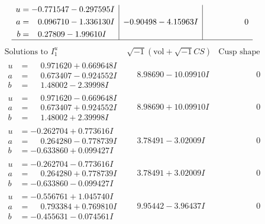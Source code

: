 \documentclass[1p]{elsarticle_modified}
\theoremstyle{definition}
\newcommand{\I}{\sqrt{-1}}
\begin{document}
$$\begin{array}{c|c|c}
\begin{aligned}
u &= -0.771547 - 0.297595 I \\
a &= \phantom{-}0.096710 - 1.336130 I \\
b &= \phantom{-}0.27809 - 1.99610 I\end{aligned}
 & -0.90498 - 4.15963 I & \phantom{-0.000000 } 0\\
 \hline 
 \end{array}$$\newpage$$\begin{array}{c|c|c}  
\text{Solutions to }I^u_{1}& \I (\text{vol} + \sqrt{-1}CS) & \text{Cusp shape}\\
 \hline 
\begin{aligned}
u &= \phantom{-}0.971620 + 0.669648 I \\
a &= \phantom{-}0.673407 - 0.924552 I \\
b &= \phantom{-}1.48002 - 2.39998 I\end{aligned}
 & \phantom{-}8.98690 - 10.09910 I & \phantom{-0.000000 } 0 \\ \hline\begin{aligned}
u &= \phantom{-}0.971620 - 0.669648 I \\
a &= \phantom{-}0.673407 + 0.924552 I \\
b &= \phantom{-}1.48002 + 2.39998 I\end{aligned}
 & \phantom{-}8.98690 + 10.09910 I & \phantom{-0.000000 } 0 \\ \hline\begin{aligned}
u &= -0.262704 + 0.773616 I \\
a &= \phantom{-}0.264280 - 0.778739 I \\
b &= -0.633860 + 0.099427 I\end{aligned}
 & \phantom{-}3.78491 - 3.02009 I & \phantom{-0.000000 } 0 \\ \hline\begin{aligned}
u &= -0.262704 - 0.773616 I \\
a &= \phantom{-}0.264280 + 0.778739 I \\
b &= -0.633860 - 0.099427 I\end{aligned}
 & \phantom{-}3.78491 + 3.02009 I & \phantom{-0.000000 } 0 \\ \hline\begin{aligned}
u &= -0.556761 + 1.045740 I \\
a &= \phantom{-}0.793384 + 0.769810 I \\
b &= -0.455631 - 0.074561 I\end{aligned}
 & \phantom{-}9.95442 - 3.96437 I & \phantom{-0.000000 } 0 \\ \hline\begin{aligned}

\end{aligned}
\end{array}$$
\end{document}

